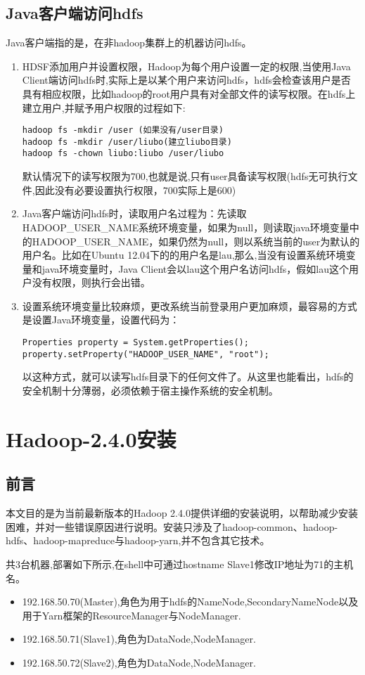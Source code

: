 \subsection{Java客户端访问hdfs}
\par Java客户端指的是，在非hadoop集群上的机器访问hdfs。
\begin{enumerate}[(1)]
\item HDSF添加用户并设置权限，Hadoop为每个用户设置一定的权限,当使用Java Client端访问hdfs时,实际上是以某个用户来访问hdfs，hdfs会检查该用户是否具有相应权限，比如hadoop的root用户具有对全部文件的读写权限。在hdfs上建立用户,并赋予用户权限的过程如下:
\begin{verbatim}
hadoop fs -mkdir /user (如果没有/user目录)
hadoop fs -mkdir /user/liubo(建立liubo目录)
hadoop fs -chown liubo:liubo /user/liubo
\end{verbatim}
\par 默认情况下的读写权限为700,也就是说,只有user具备读写权限(hdfs无可执行文件,因此没有必要设置执行权限，700实际上是600)
\item Java客户端访问hdfs时，读取用户名过程为：先读取HADOOP\_USER\_NAME系统环境变量，如果为null，则读取java环境变量中的HADOOP\_USER\_NAME，如果仍然为null，则以系统当前的user为默认的用户名。比如在Ubuntu 12.04下的的用户名是lau,那么,当没有设置系统环境变量和java环境变量时，Java Client会以lau这个用户名访问hdfs，假如lau这个用户没有权限，则执行会出错。
\item 设置系统环境变量比较麻烦，更改系统当前登录用户更加麻烦，最容易的方式是设置Java环境变量，设置代码为：
\begin{verbatim}
Properties property = System.getProperties();
property.setProperty("HADOOP_USER_NAME", "root");
\end{verbatim}
\par 以这种方式，就可以读写hdfs目录下的任何文件了。从这里也能看出，hdfs的安全机制十分薄弱，必须依赖于宿主操作系统的安全机制。
\end{enumerate}
\section{Hadoop-2.4.0安装}
\subsection{前言}
\par 本文目的是为当前最新版本的Hadoop 2.4.0提供详细的安装说明，以帮助减少安装困难，并对一些错误原因进行说明。安装只涉及了hadoop-common、hadoop-hdfs、hadoop-mapreduce与hadoop-yarn,并不包含其它技术。
\par 共3台机器,部署如下所示,在shell中可通过hostname Slave1修改IP地址为71的主机名。
\begin{itemize}
\item 192.168.50.70(Master),角色为用于hdfs的NameNode,SecondaryNameNode以及用于Yarn框架的ResourceManager与NodeManager.
\item 192.168.50.71(Slave1),角色为DataNode,NodeManager.
\item 192.168.50.72(Slave2),角色为DataNode,NodeManager.
\end{itemize}
